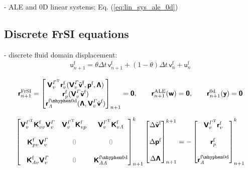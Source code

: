 \documentclass[a4paper,12pt]{report}
\newcommand{\fF}{\text{f}}
\newcommand{\bs}[1]{\boldsymbol{#1}}
\newcommand{\Gm}{\mathit{\Gamma}}
\newcommand{\zerom}{\textcolor{lightgray}{\bs{\mathsf{0}}}}
\newcommand{\ROP}{\bs{\mathsf{r}}}
\newcommand{\zd}{\bs{\mathsf{y}}} %
\newcommand{\VF}{\bs{\mathsf{v}}^{\fF}}
\newcommand{\UF}{\bs{\mathsf{u}}^{\fF}}
\newcommand{\PF}{\bs{\mathsf{p}}^{\fF}}
\newcommand{\VA}{\bs{\mathsf{w}}}
\newcommand{\LMZ}{\bs{\mathsf{\Lambda}}}
\newcommand{\Y}{\bs{\mathsf{y}}} %
\newcommand{\VFr}{\tilde{\bs{\mathsf{v}}}^{\fF}}
\newcommand{\lmzi}{\mathit{\Lambda}} %
\begin{document}
- ALE and 0D linear systems: Eq. (\ref{eq:lin_sys_ale_0d})


\subsection{Discrete FrSI equations}

- discrete fluid domain displacement:
\begin{align}
\UF_{n+1} = \theta \Delta t\,\VF_{n+1} + (1-\theta)\Delta t\, \VF_{n} + \UF_{n} \label{eq:ufluid_discr}
\end{align}

\begin{align}
    \ROP^{\mathrm{FrSI}}_{n+1} = \begin{bmatrix} \bs{\mathsf{V}}_{v}^{\Gm^\mathrm{T}}\ROP_{v}^{\fF}(\bs{\mathsf{V}}_{v}^{\Gm}\VFr,\PF,\LMZ) \\ \ROP_{p}^{\fF}(\bs{\mathsf{V}}_{v}^{\Gm}\VFr) \\ \ROP_{\lmzi}^{\mathrm{\fF\mhyphen 0d}}(\LMZ,\bs{\mathsf{V}}_{v}^{\Gm}\VFr)\end{bmatrix}_{n+1} = \bs{\mathsf{0}},
    \qquad \bs{\mathsf{r}}_{n+1}^{\mathrm{ALE}}(\VA) = \bs{\mathsf{0}},
    \qquad \bs{\mathsf{r}}_{n+1}^{\mathrm{0d}}(\Y) = \bs{\mathsf{0}}\label{eq:res_nonlin_frsi}
\end{align}

\begin{align}
    \begin{bmatrix} \bs{\mathsf{V}}_{v}^{\Gm^\mathrm{T}}\bs{\mathsf{K}}_{vv}^{\fF}\bs{\mathsf{V}}_{v}^{\Gm} & \bs{\mathsf{V}}_{v}^{\Gm^\mathrm{T}}\bs{\mathsf{K}}_{vp}^{\fF} & \bs{\mathsf{V}}_{v}^{\Gm^\mathrm{T}}\bs{\mathsf{K}}_{v\lmzi}^{\fF} \\ \\ \bs{\mathsf{K}}_{pv}^{\fF}\bs{\mathsf{V}}_{v}^{\Gm} & \zerom & \zerom \\ \\  \bs{\mathsf{K}}_{\lmzi v}^{\fF}\bs{\mathsf{V}}_{v}^{\Gm} & \zerom & \bs{\mathsf{K}}_{\lmzi\lmzi}^{\mathrm{\fF\mhyphen 0d}}\end{bmatrix}_{n+1}^{k}\begin{bmatrix} \Delta\tilde{\bs{\mathsf{v}}}^{\fF} \\ \\ \Delta\PF \\ \\ \Delta\LMZ \end{bmatrix}_{n+1}^{k+1}=-\begin{bmatrix} \bs{\mathsf{V}}_{v}^{\Gm^\mathrm{T}}\ROP_{v}^{\fF} \\ \\ \ROP_{p}^{\fF} \\ \\ \ROP_{\lmzi}^{\mathrm{\fF\mhyphen 0d}}\end{bmatrix}_{n+1}^{k} \label{eq:lin_sys_rom_frsi}
\end{align}
\end{document}
